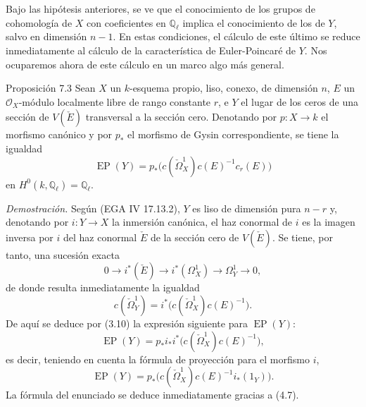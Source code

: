 Bajo las hipótesis anteriores, se ve que el conocimiento de los grupos de cohomología de $X$ con coeficientes en $\mathbb Q_\ell$ implica el conocimiento de los de $Y$, salvo en dimensión $n-1$. En estas condiciones, el cálculo de este último se reduce inmediatamente al cálculo de la característica de Euler-Poincaré de $Y$. Nos ocuparemos ahora de este cálculo en un marco algo más general.

\begin{statement}{Proposición 7.3}
Sean $X$ un $k$-esquema propio, liso, conexo, de dimensión $n$, $E$ un $\mathcal O_X$-módulo localmente libre de rango constante $r$, e $Y$ el lugar de los ceros de una sección de $V(\check E)$ transversal a la sección cero. Denotando por $p:X\to k$ el morfismo canónico y por $p_*$ el morfismo de Gysin correspondiente, se tiene la igualdad
\[
\operatorname{EP}(Y)=p_*\bigl(c(\check\Omega_X^1)c(E)^{-1}c_r(E)\bigr)
\]
en $H^0(k,\mathbb Q_\ell)=\mathbb Q_\ell$.
\end{statement}

\emph{Demostración.} Según (EGA IV 17.13.2), $Y$ es liso de dimensión pura $n-r$ y, denotando por $i:Y\to X$ la inmersión canónica, el haz conormal de $i$ es la imagen inversa por $i$ del haz conormal $\check E$ de la sección cero de $V(\check E)$. Se tiene, por tanto, una sucesión exacta
\[
0\to i^*(\check E)\to i^*(\Omega_X^1)\to\Omega_Y^1\to0,
\tag{7.3.1}
\]
de donde resulta inmediatamente la igualdad
\[
c(\check\Omega_Y^1)=i^*\bigl(c(\check\Omega_X^1)c(E)^{-1}\bigr).
\tag{7.3.2}
\]
De aquí se deduce por (3.10) la expresión siguiente para $\operatorname{EP}(Y)$:
\[
\operatorname{EP}(Y)=p_*i_*i^*\bigl(c(\check\Omega_X^1)c(E)^{-1}\bigr),
\]
es decir, teniendo en cuenta la fórmula de proyección para el morfismo $i$,
\[
\operatorname{EP}(Y)=p_*\bigl(c(\check\Omega_X^1)c(E)^{-1}i_*(1_Y)\bigr).
\]
La fórmula del enunciado se deduce inmediatamente gracias a (4.7).
